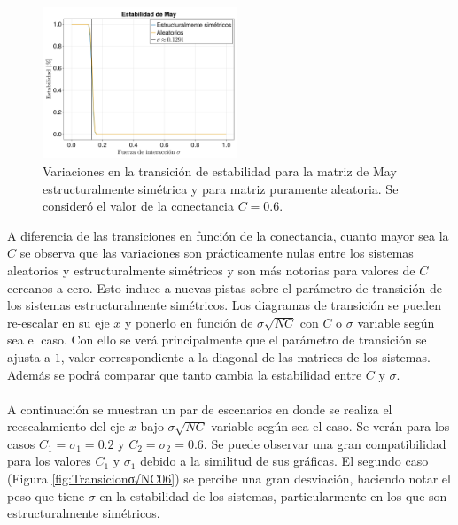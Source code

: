 \newpage
\begin{figure} \vspace{-30pt} \begin{center}
		\includegraphics[width=0.52\textwidth]{../Imagenes/TransicionσDirvsNoDir} 
	\end{center} 
	\vspace{-20pt} 
	\caption{Variaciones en la transición de estabilidad para la matriz de May estructuralmente simétrica y para matriz puramente aleatoria. Se consideró el valor de la conectancia $C=0.6$.} 
	\vspace{-10pt}
	\label{fig:TransicionσDirvsNoDir}
\end{figure} 
A diferencia de las transiciones en función de la conectancia, cuanto mayor sea la $C$ se observa que las variaciones son prácticamente nulas entre los sistemas aleatorios y estructuralmente simétricos y son más notorias para valores de $C$ cercanos a cero. Esto induce a nuevas pistas sobre el parámetro de transición de los sistemas estructuralmente simétricos. Los diagramas de transición se pueden re-escalar en su eje $x$ y ponerlo en función de $\sigma\sqrt{NC}$ con $C$ o $\sigma$ variable según sea el caso. Con ello se verá principalmente que el parámetro de transición se ajusta a $1$, valor correspondiente a la diagonal de las matrices de los sistemas. Además se podrá comparar que tanto cambia la estabilidad entre $C$ y $\sigma$. 
\\
\\
A continuación se muestran un par de escenarios en donde se realiza el reescalamiento del eje $x$ bajo $\sigma\sqrt{NC}$ variable según sea el caso. Se verán para los casos $C_1=\sigma_1=0.2$ y $C_2=\sigma_2=0.6$. Se puede observar una gran compatibilidad para los valores $C_1$ y $\sigma_1$ debido a la similitud de sus gráficas. El segundo caso (Figura \ref{fig:Transicionσ√NC06}) se percibe una gran desviación, haciendo notar el peso que tiene $\sigma$ en la estabilidad de los sistemas, particularmente en los que son estructuralmente simétricos.
